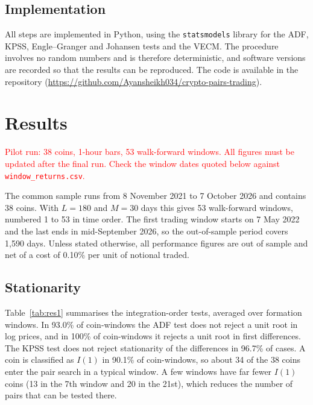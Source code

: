 \documentclass[10pt,a4paper,twocolumn]{article}
\newcommand{\TBD}[1]{\textcolor{red}{#1}}
\newcommand{\repo}{https://github.com/Ayansheikh034/crypto-pairs-trading}
\begin{document}
	\subsection{Implementation}
	\label{sec:impl}
	All steps are implemented in Python, using the \texttt{statsmodels} library \cite{seabold2010} for the ADF, KPSS, Engle--Granger and Johansen tests and the VECM. The procedure involves no random numbers and is therefore deterministic, and software versions are recorded so that the results can be reproduced. The code is available in the repository (\url{\repo}).
	



\section{Results}
\label{sec:results}
\TBD{Pilot run: 38 coins, 1-hour bars, 53 walk-forward windows. All figures must be updated after the final run. Check the window dates quoted below against \texttt{window\_returns.csv}.}

The common sample runs from 8 November 2021 to 7 October 2026 and contains 38 coins. With $L=180$ and $M=30$ days this gives 53 walk-forward windows, numbered 1 to 53 in time order. The first trading window starts on 7 May 2022 and the last ends in mid-September 2026, so the out-of-sample period covers 1{,}590 days. Unless stated otherwise, all performance figures are out of sample and net of a cost of 0.10\% per unit of notional traded.

\subsection{Stationarity }
Table~\ref{tab:res1} summarises the integration-order tests, averaged over formation windows. In 93.0\% of coin-windows the ADF test does not reject a unit root in log prices, and in 100\% of coin-windows it rejects a unit root in first differences. The KPSS test does not reject stationarity of the differences in 96.7\% of cases. A coin is classified as $I(1)$ in 90.1\% of coin-windows, so about 34 of the 38 coins enter the pair search in a typical window. A few windows have far fewer $I(1)$ coins (13 in the 7th window and 20 in the 21st), which reduces the number of pairs that can be tested there.
\end{document}
